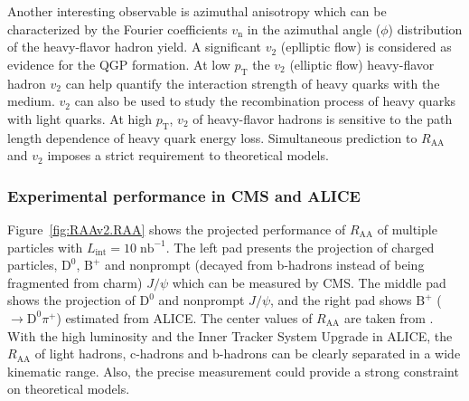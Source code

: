 Another interesting observable is azimuthal anisotropy which can be characterized by the Fourier coefficients $v_{\mathrm{n}}$ in the azimuthal angle ($\phi$) distribution of the heavy-flavor hadron yield. A significant $v_{2}$ (eplliptic flow) is considered as evidence for the QGP formation. At low $p_{\mathrm{T}}$ the $v_{2}$ (elliptic flow) heavy-flavor hadron $v_{2}$ can help quantify the interaction strength of heavy quarks with the medium. $v_{2}$ can also be used to study the recombination process of heavy quarks with light quarks. At high $p_{\mathrm{T}}$, $v_{2}$ of heavy-flavor hadrons is sensitive to the path length dependence of heavy quark energy loss. Simultaneous prediction to $R_{\mathrm{AA}}$ and $v_{2}$ imposes a strict requirement to theoretical models.

\subsubsection{Experimental performance in CMS and ALICE}

Figure~\ref{fig:RAAv2.RAA} shows the projected performance of $R_{\mathrm{AA}}$ of multiple particles with $L_{\mathrm{int}}=10\;\mathrm{nb}^{-1}$. The left pad presents the projection of charged particles, $\mathrm{D}^{0}$, $\mathrm{B}^{+}$ and nonprompt (decayed from b-hadrons instead of being fragmented from charm) $J/\psi$ which can be measured by CMS. The middle pad shows the projection of $\mathrm{D}^{0}$ and nonprompt $J/\psi$, and the right pad shows $\mathrm{B}^{+}$ ($\rightarrow \mathrm{D}^{0}\pi^{+}$) estimated from ALICE. The center values of $R_{\mathrm{AA}}$ are taken from \cite{raatheory}. With the high luminosity and the Inner Tracker System Upgrade in ALICE, the $R_{\mathrm{AA}}$ of light hadrons, c-hadrons and b-hadrons can be clearly separated in a wide kinematic range. Also, the precise measurement could provide a strong constraint on theoretical models.

